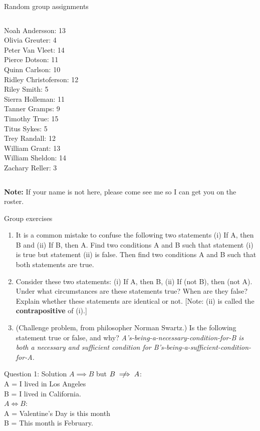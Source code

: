 \documentclass[10pt]{beamer}
\begin{document}
\begin{frame}{Random group assignments}
\begin{columns}
\begin{column}{0.33\textwidth}
Noah Andersson: 13 \\ 
Olivia Greuter: 4 \\ 
Peter Van Vleet: 14 \\ 
Pierce Dotson: 11 \\ 
Quinn Carlson: 10 \\ 
Ridley Christoferson: 12 \\ 
Riley Smith: 5 \\ 
Sierra Holleman: 11 \\ 
Tanner Gramps: 9 \\ 
Timothy True: 15 \\ 
Titus Sykes: 5 \\ 
Trey Randall: 12 \\ 
William Grant: 13 \\ 
William Sheldon: 14 \\ 
Zachary Reller: 3 \\\end{column}
\end{columns}
\vfill \vfill \vfill
\textbf{Note:} If your name is not here, please come see me so I can get you on the roster. 
\end{frame}



\begin{frame}{Group exercises}
\small 
\begin{enumerate}
	\item It is a common mistake to confuse the following two statements (i) If A, then B and (ii) If B, then A. Find two conditions A and B such that statement (i) is true but statement (ii) is false. Then find two conditions A and B such that both statements are true. 
	\item Consider these two statements: (i) If A, then B, (ii) If (not B), then (not A).  Under what circumstances are these statements true?  When are they false? Explain whether these statements are identical or not. \alert{[Note: (ii) is called the \textbf{contrapositive} of (i).]}
	\item (Challenge problem, from philosopher Norman Swartz.)  Is the following statement true or false, and why? \textit{A's-being-a-necessary-condition-for-B is both a necessary and sufficient condition for B's-being-a-sufficient-condition-for-A.}
\end{enumerate}
	
\end{frame}


\begin{frame}{Question 1: Solution}
$A \implies B$ but $B \centernot\implies A$: \\
A = I lived in Los Angeles \\
B = I lived in California. \\
\vfill 
$A \iff B$: \\
A = Valentine's Day is this month \\
B = This month is February. 
\end{frame}
\end{document}
